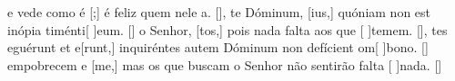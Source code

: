 {    { e vede como é [;] é feliz quem nele a. [\LinkPT]},
  {te Dóminum, [ius,] quóniam non est inópia timénti[ ]{e}um. [\LinkLA]}%
    { o Senhor, [tos,] pois nada falta aos que [ ]{te}mem. [\LinkPT]},
  {tes eguérunt et e[runt,] inquiréntes autem Dóminum non defícient om[ ]{bo}no. [\LinkLA]}%
    { empobrecem e [me,] mas os que buscam o Senhor não sentirão falta [ ]{na}da. [\LinkPT]}
}